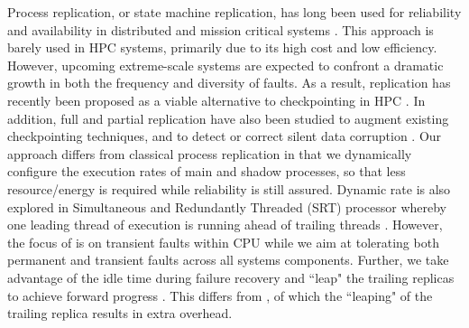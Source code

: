 Process replication, or state machine replication, has long been used for reliability and availability in distributed and mission critical systems \cite{schneider_1990_tutorial}. %
This approach is barely used in HPC systems, primarily due to its high cost and low efficiency.
However, upcoming extreme-scale systems are expected to 
confront a dramatic growth in both the frequency and diversity of faults.
As a result,
replication has recently been proposed as a
viable alternative to checkpointing in HPC \cite{engelmann09case,Cappello:09:Fault}. 
In addition, full and partial
replication have also been studied to augment existing checkpointing techniques, and to  
detect or correct silent data corruption \cite{stearly_2012_partial,elliott_2012_cpr,ferreira_sc_2011,fiala_2012_sdc}. %
Our approach differs from classical process replication in that we dynamically configure the execution rates of main and shadow processes, so that less resource/energy is required while reliability is still assured.  
Dynamic rate is also explored in Simultaneous and Redundantly Threaded (SRT) processor whereby one leading thread of execution is running ahead of trailing threads \cite{reinhardt2000transient}. However, 
the focus of \cite{reinhardt2000transient} is on transient faults within CPU while we aim at tolerating both permanent and transient faults across all systems components.
Further, we take advantage of the idle time during failure recovery and ``leap" the trailing replicas to achieve forward progress%
. This differs from \cite{reinhardt2000transient}, of which the ``leaping" of the trailing replica results in extra overhead.
